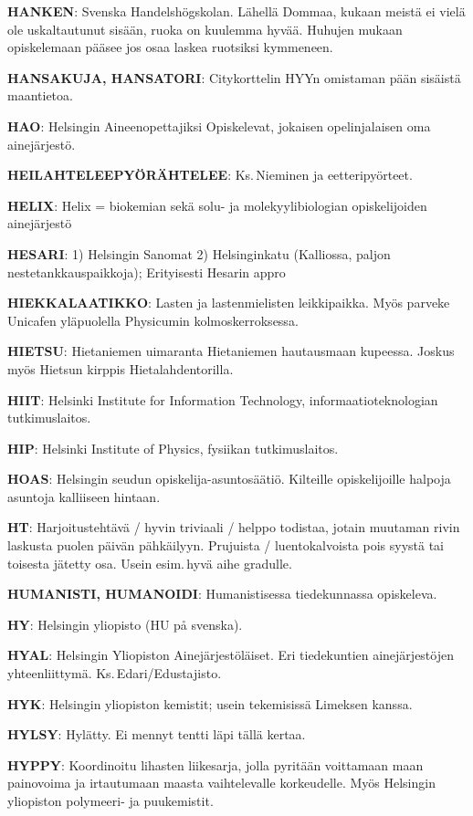 \documentclass[../ala_hataile.tex]{subfiles}
\begin{document}
\textbf{HANKEN}: Svenska Handelshögskolan.
Lähellä Dommaa, kukaan meistä ei vielä
ole uskaltautunut sisään, ruoka on kuulemma
hyvää. Huhujen mukaan opiskelemaan
pääsee jos osaa laskea ruotsiksi kymmeneen.

\textbf{HANSAKUJA, HANSATORI}: Citykorttelin
HYYn omistaman pään sisäistä
maantietoa.

\textbf{HAO}: Helsingin Aineenopettajiksi Opiskelevat,
jokaisen opelinjalaisen oma ainejärjestö.

\textbf{HEILAHTELEEPYÖRÄHTELEE}:
Ks.\,Nieminen ja eetteripyörteet.

\textbf{HELIX}: Helix = biokemian sekä solu- ja
molekyylibiologian opiskelijoiden ainejärjestö

\textbf{HESARI}: 1) Helsingin Sanomat 2) Helsinginkatu
(Kalliossa, paljon nestetankkauspaikkoja);
Erityisesti Hesarin appro

\textbf{HIEKKALAATIKKO}: Lasten ja lastenmielisten
leikkipaikka. Myös parveke
Unicafen yläpuolella Physicumin kolmoskerroksessa.

\textbf{HIETSU}: Hietaniemen uimaranta Hietaniemen
hautausmaan kupeessa. Joskus
myös Hietsun kirppis Hietalahdentorilla.

\textbf{HIIT}: Helsinki Institute for Information
Technology, informaatioteknologian tutkimuslaitos.

\textbf{HIP}: Helsinki Institute of Physics, fysiikan
tutkimuslaitos.

\textbf{HOAS}: Helsingin seudun opiskelija-asuntosäätiö.
Kilteille opiskelijoille halpoja
asuntoja kalliiseen hintaan.

\textbf{HT}: Harjoitustehtävä / hyvin triviaali /
helppo todistaa, jotain muutaman rivin laskusta
puolen päivän pähkäilyyn. Prujuista
/ luentokalvoista pois syystä tai toisesta jätetty
osa. Usein esim.\,hyvä aihe gradulle.

\textbf{HUMANISTI, HUMANOIDI}: Humanistisessa
tiedekunnassa opiskeleva.

\textbf{HY}: Helsingin yliopisto (HU på svenska).

\textbf{HYAL}: Helsingin Yliopiston Ainejärjestöläiset.
Eri tiedekuntien ainejärjestöjen yhteenliittymä.
Ks.\,Edari/Edustajisto.

\textbf{HYK}: Helsingin yliopiston kemistit; usein
tekemisissä Limeksen kanssa.

\textbf{HYLSY}: Hylätty. Ei mennyt tentti läpi tällä
kertaa.

\textbf{HYPPY}: Koordinoitu lihasten liikesarja,
jolla pyritään voittamaan maan painovoima
ja irtautumaan maasta vaihtelevalle
korkeudelle. Myös Helsingin yliopiston
polymeeri- ja puukemistit.
\end{document}
